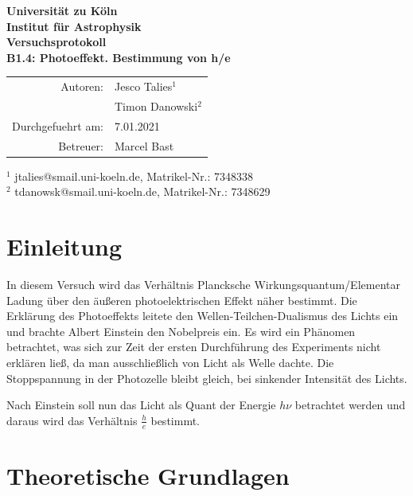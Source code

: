 \documentclass{scrartcl}
\begin{document}
\thispagestyle{empty}
\vspace*{\fill}
\begin{center}
	\Huge
	\textbf{Universität zu Köln}\\
	\LARGE
	\textbf{Institut für Astrophysik}\\
	\vspace{2cm}
	\textbf{Versuchsprotokoll}\\
	\vspace{0.5cm}
	\large
	\textbf{B1.4: Photoeffekt. Bestimmung von h/e}\\
	\normalsize
	\vspace{2cm}
	\begin{tabular}{r l}
		Autoren: 	& Jesco Talies$^1$\\
					& Timon Danowski$^2$\\
		Durchgefuehrt am:	& 7.01.2021\\
		Betreuer:	& Marcel Bast
	\end{tabular}
\end{center}
\vfill\footnotesize
$^1$ jtalies@smail.uni-koeln.de, Matrikel-Nr.: 7348338\\
$^2$ tdanowsk@smail.uni-koeln.de, Matrikel-Nr.: 7348629\\
\normalsize

\newpage
\thispagestyle{empty}
\tableofcontents
\clearpage
\setcounter{page}{1}





\section{Einleitung}
	In diesem Versuch wird das Verhältnis Plancksche Wirkungsquantum/Elementar Ladung über den äußeren photoelektrischen Effekt
	näher bestimmt.
	Die Erklärung des Photoeffekts leitete den Wellen-Teilchen-Dualismus des Lichts ein und brachte
	Albert Einstein den Nobelpreis ein. Es wird ein Phänomen betrachtet, was sich zur Zeit der
	ersten Durchführung des Experiments nicht erklären ließ, da man ausschließlich von Licht als Welle dachte.
	Die Stoppspannung in der Photozelle bleibt gleich, bei sinkender Intensität des Lichts.
	
	Nach Einstein soll nun das Licht als Quant der Energie $h\nu$ betrachtet werden und daraus 
	wird das Verhältnis $\frac{h}{e}$ bestimmt.
\section{Theoretische Grundlagen}
\end{document}
